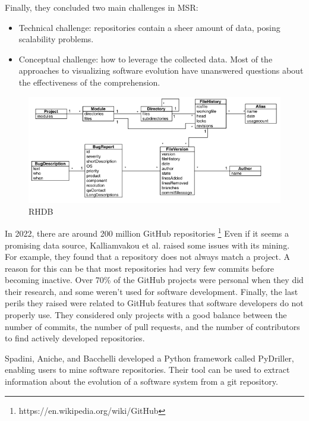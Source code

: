 Finally, they concluded two main challenges in MSR:
\begin{itemize}
  \item Technical challenge: repositories contain a sheer amount of data, posing scalability problems. 
  \item Conceptual challenge: how to leverage the collected data. 
  Most of the approaches to visualizing software evolution have unanswered questions about the effectiveness of the comprehension. 
\end{itemize}

\begin{figure}[H]
\centering
  \includegraphics[width=0.9\linewidth]{RHDB.png} 
  \caption{RHDB}
  \label{fig:RHDB}
\end{figure}
 


In 2022, there are around 200 million GitHub repositories \footnote{https://en.wikipedia.org/wiki/GitHub}
Even if it seems a promising data source, Kalliamvakou et al. raised some issues with its mining. \cite{Kalliamvakou2014} 
For example, they found that a repository does not always match a project. 
A reason for this can be that most repositories had very few commits before becoming inactive.
Over 70\% of the GitHub projects were personal when they did their research, and some weren't used for software development. 
Finally, the last perils they raised were related to GitHub features that software developers do not properly use.
They considered only projects with a good balance between the number of commits, 
the number of pull requests, and the number of contributors to find actively developed repositories. 
 

Spadini, Aniche, and Bacchelli \cite{Spadini2018} developed a Python framework called PyDriller, enabling users to mine software repositories. 
Their tool can be used to extract information about the evolution of a software system from a git repository.  

